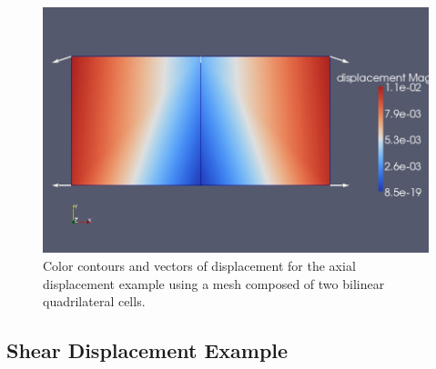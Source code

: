 \noindent \begin{center}
\begin{figure}[t]
\begin{centering}
\includegraphics[scale=0.33]{tutorials/twocells/figs/twoquad4-axialdisp}
\par\end{centering}

\caption{Color contours and vectors of displacement for the axial displacement
example using a mesh composed of two bilinear quadrilateral cells.\label{fig:twoquad4-axial}}
\end{figure}

\par\end{center}


\subsection{Shear Displacement Example}

